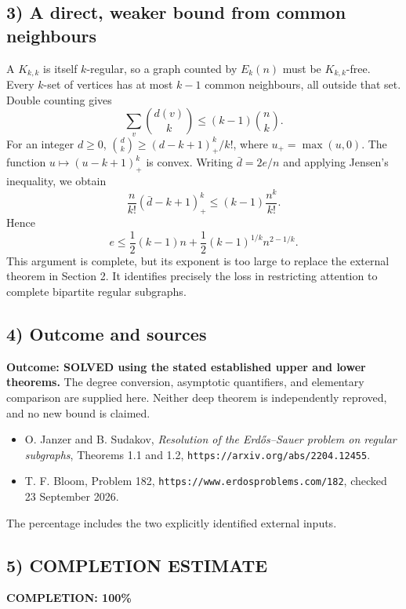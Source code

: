 \subsection{3) A direct, weaker bound from common neighbours}
A $K_{k,k}$ is itself $k$-regular, so a graph counted by $E_k(n)$ must
be $K_{k,k}$-free. Every $k$-set of vertices has at most $k-1$ common
neighbours, all outside that set. Double counting gives
\[
 \sum_{v}\binom{d(v)}k\leq(k-1)\binom nk.
\]
For an integer $d\geq0$,
$\binom dk\geq(d-k+1)_+^k/k!$, where $u_+=\max(u,0)$.
The function $u\mapsto(u-k+1)_+^k$ is convex. Writing
$\bar d=2e/n$ and applying Jensen's inequality, we obtain
\[
 \frac n{k!}(\bar d-k+1)_+^k
 \leq(k-1)\frac{n^k}{k!}.
\]
Hence
\[
 e\leq\frac12(k-1)n+\frac12(k-1)^{1/k}n^{2-1/k}.
\]
This argument is complete, but its exponent is too large to replace
the external theorem in Section 2. It identifies precisely the loss
in restricting attention to complete bipartite regular subgraphs.

\subsection{4) Outcome and sources}
\textbf{Outcome: SOLVED using the stated established upper and lower
theorems.} The degree conversion, asymptotic quantifiers, and elementary
comparison are supplied here. Neither deep theorem is independently
reproved, and no new bound is claimed.
\begin{itemize}
\item O. Janzer and B. Sudakov, \emph{Resolution of the Erd\H{o}s--Sauer
problem on regular subgraphs}, Theorems 1.1 and 1.2,
\texttt{https://arxiv.org/abs/2204.12455}.
\item T. F. Bloom, Problem 182,
\texttt{https://www.erdosproblems.com/182}, checked 23 September 2026.
\end{itemize}
The percentage includes the two explicitly identified external inputs.
\subsection{5) COMPLETION ESTIMATE}
\textbf{COMPLETION: 100\%}
